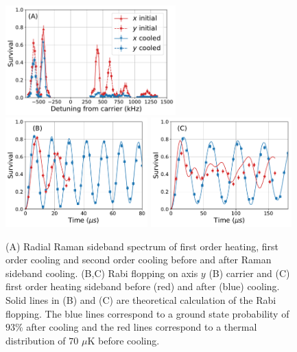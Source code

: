 \documentclass[aps,prl,twocolumn,groupedaddress]{revtex4-1}
\begin{document}
\begin{figure}
  \includegraphics[height=4.2cm]{imgs/spectrum_r.pdf}
  \includegraphics[height=4.2cm]{imgs/rabi_flop_r3_0.pdf}
  \includegraphics[height=4.2cm]{imgs/rabi_flop_r3_p1.pdf}
  \caption{(A) Radial Raman sideband spectrum of first order heating, first order cooling and
    second order cooling before and after Raman sideband cooling.
    (B,C) Rabi flopping on axis $y$ (B) carrier and (C) first order heating sideband
    before (red) and after (blue) cooling.
    Solid lines in (B) and (C) are theoretical calculation of the Rabi flopping.
    The blue lines correspond to a ground state probability of $93$\% after cooling and
    the red lines correspond to a thermal distribution of $70$ $\mu$K before cooling.
    \label{f-radial}}
\end{figure}
\end{document}
